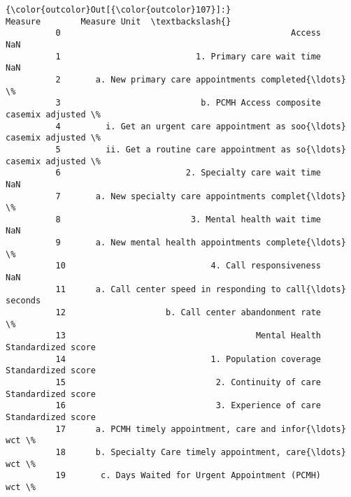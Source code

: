 \documentclass[11pt]{article}
\begin{document}
\begin{Verbatim}[commandchars=\\\{\}]
{\color{outcolor}Out[{\color{outcolor}107}]:}                                               Measure        Measure Unit  \textbackslash{}
          0                                              Access                 NaN   
          1                           1. Primary care wait time                 NaN   
          2       a. New primary care appointments completed{\ldots}                   \%   
          3                            b. PCMH Access composite  casemix adjusted \%   
          4         i. Get an urgent care appointment as soo{\ldots}  casemix adjusted \%   
          5         ii. Get a routine care appointment as so{\ldots}  casemix adjusted \%   
          6                         2. Specialty care wait time                 NaN   
          7       a. New specialty care appointments complet{\ldots}                   \%   
          8                          3. Mental health wait time                 NaN   
          9       a. New mental health appointments complete{\ldots}                   \%   
          10                             4. Call responsiveness                 NaN   
          11      a. Call center speed in responding to call{\ldots}             seconds   
          12                    b. Call center abandonment rate                   \%   
          13                                      Mental Health  Standardized score   
          14                             1. Population coverage  Standardized score   
          15                              2. Continuity of care  Standardized score   
          16                              3. Experience of care  Standardized score   
          17      a. PCMH timely appointment, care and infor{\ldots}               wct \%   
          18      b. Specialty Care timely appointment, care{\ldots}               wct \%   
          19       c. Days Waited for Urgent Appointment (PCMH)               wct \%   
          

\end{Verbatim}
\end{document}
